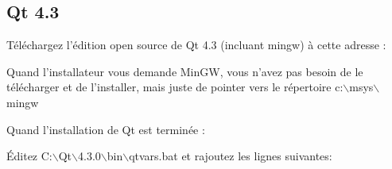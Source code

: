 %
%
%
%

\subsection{Qt 4.3}
T\'el\'echargez l'\'edition open source de Qt 4.3 (incluant mingw) \`a cette adresse : 


Quand l'installateur vous demande MinGW, vous n'avez pas besoin de le
t\'el\'echarger et de l'installer, mais juste de pointer vers le r\'epertoire
c:$\backslash$msys$\backslash$mingw

Quand l'installation de Qt est termin\'ee :

\'Editez C:$\backslash$Qt$\backslash$4.3.0$\backslash$bin$\backslash$qtvars.bat et
rajoutez les lignes suivantes:

%
%

